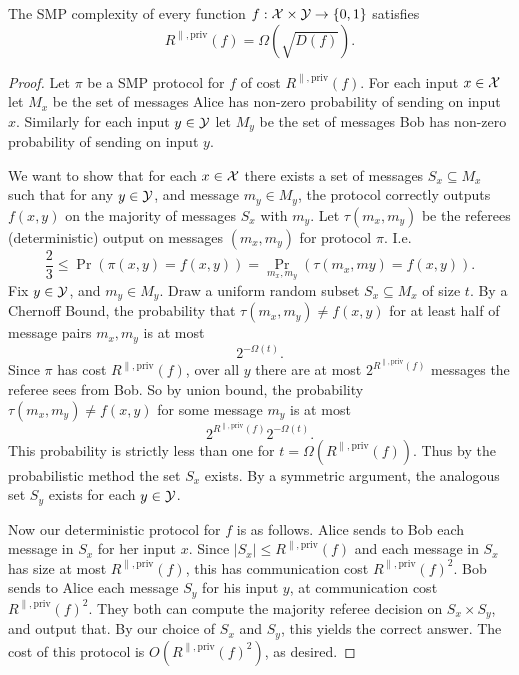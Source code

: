 \begin{theorem}
The SMP complexity of every function $f : \mathcal{X} \times \mathcal{Y} \to \{0,1\}$ satisfies
\[
R^{\parallel,\mathrm{priv}}(f) = \Omega(\sqrt{D(f)}).
\]
\end{theorem}

\begin{proof}
	Let $\pi$ be a SMP protocol for $f$ of cost $R^{\parallel,\mathrm{priv}}(f)$. For each input $x\in\mathcal{X}$ let $M_x$ be the set of messages Alice has non-zero probability of sending on input $x$. Similarly for each input $y\in\mathcal{Y}$ let $M_y$ be the set of messages Bob has non-zero probability of sending on input $y$.
	
	We want to show that for each $x \in \mathcal{X}$ there exists a set of messages $S_x \subseteq M_x$ such that for any $y \in \mathcal{Y}$, and message $m_y \in M_y$, the protocol correctly outputs $f(x,y)$ on the majority of messages $S_x$ with $m_y$. Let $\tau(m_x,m_y)$ be the referees (deterministic) output on messages $(m_x,m_y)$ for protocol $\pi$. I.e.
	$$\frac{2}{3} \leq \Pr(\pi(x,y) = f(x,y)) = \Pr_{m_x,m_y}(\tau(m_x,my) = f(x,y)).$$
	Fix $y\in \mathcal{Y}$, and $m_y \in M_y$. Draw a uniform random subset $S_x \subseteq M_x$  of size $t$. By a Chernoff Bound, the probability that $\tau(m_x,m_y) \neq f(x,y)$ for at least half of message pairs $m_x, m_y$ is at most
	$$2^{-\Omega(t)}.$$
	Since $\pi$ has cost $R^{\parallel,\mathrm{priv}}(f)$, over all $y$ there are at most $2^{R^{\parallel,\mathrm{priv}}(f)}$ messages the referee sees from Bob. So by union bound, the probability $\tau(m_x,m_y) \neq f(x,y)$ for some message $m_y$ is at most
	$$2^{R^{\parallel,\mathrm{priv}}(f)}2^{-\Omega(t)}.$$
	This probability is strictly less than one for $t = \Omega(R^{\parallel,\mathrm{priv}}(f))$. Thus by the probabilistic method the set $S_x$ exists. By a symmetric argument, the analogous set $S_y$ exists for each $y \in \mathcal{Y}$.
	
	Now our deterministic protocol for $f$ is as follows. Alice sends to Bob each message in $S_x$ for her input $x$. Since $|S_x| \leq R^{\parallel,\mathrm{priv}}(f)$ and each message in $S_x$ has size at most $R^{\parallel,\mathrm{priv}}(f)$, this has communication cost $R^{\parallel,\mathrm{priv}}(f)^2$. Bob sends to Alice each message $S_y$ for his input $y$, at communication cost $R^{\parallel,\mathrm{priv}}(f)^2$. They both can compute the majority referee decision on $S_x\times S_y$, and output that. By our choice of $S_x$ and $S_y$, this yields the correct answer. The cost of this protocol is $O(R^{\parallel,\mathrm{priv}}(f)^2)$, as desired.
\end{proof}


